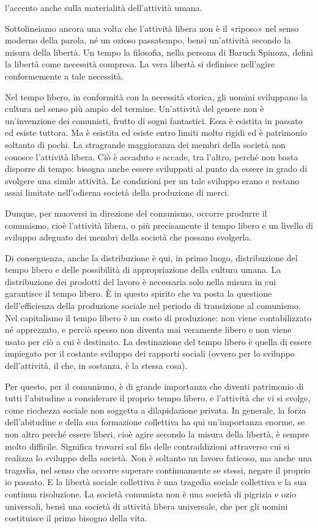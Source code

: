 \documentclass[12pt,a4paper,openany]{book}
\begin{document}
l'accento anche sulla materialità dell'attività umana.

Sottolineiamo ancora una volta che l'attività libera non è il «riposo» nel senso moderno della parola, né un ozioso passatempo, bensì un'attività secondo la misura della libertà. Un tempo la filosofia, nella persona di Baruch Spinoza, definì la libertà come necessità compresa. La vera libertà si definisce nell'agire conformemente a tale necessità.

Nel tempo libero, in conformità con la necessità storica, gli uomini sviluppano la cultura nel senso più ampio del termine. Un'attività del genere non è un'invenzione dei comunisti, frutto di sogni fantastici. Essa è esistita in passato ed esiste tuttora. Ma è esistita ed esiste entro limiti molto rigidi ed è patrimonio soltanto di pochi. La stragrande maggioranza dei membri della società non conosce l'attività libera. Ciò è accaduto e accade, tra l'altro, perché non basta disporre di tempo: bisogna anche essere sviluppati al punto da essere in grado di svolgere una simile attività. Le condizioni per un tale sviluppo erano e restano assai limitate nell'odierna società della produzione di merci.

Dunque, per muoversi in direzione del comunismo, occorre produrre il comunismo, cioè l'attività libera, o più precisamente il tempo libero e un livello di sviluppo adeguato dei membri della società che possano svolgerla.

Di conseguenza, anche la distribuzione è qui, in primo luogo, distribuzione del tempo libero e delle possibilità di appropriazione della cultura umana. La distribuzione dei prodotti del lavoro è necessaria solo nella misura in cui garantisce il tempo libero. È in questo spirito che va posta la questione dell'efficienza della produzione sociale nel periodo di transizione al comunismo. Nel capitalismo il tempo libero è un costo di produzione: non viene contabilizzato né apprezzato, e perciò spesso non diventa mai veramente libero e non viene usato per ciò a cui è destinato. La destinazione del tempo libero è quella di essere impiegato per il costante sviluppo dei rapporti sociali (ovvero per lo sviluppo dell'attività, il che, in sostanza, è la stessa cosa).

Per questo, per il comunismo, è di grande importanza che diventi patrimonio di tutti l'abitudine a considerare il proprio tempo libero, e l'attività che vi si svolge, come ricchezza sociale non soggetta a dilapidazione privata. In generale, la forza dell'abitudine e della sua formazione collettiva ha qui un'importanza enorme, se non altro perché essere liberi, cioè agire secondo la misura della libertà, è sempre molto difficile. Significa trovarsi sul filo delle contraddizioni attraverso cui si realizza lo sviluppo della società. Non è soltanto un lavoro faticoso, ma anche una tragedia, nel senso che occorre superare continuamente se stessi, negare il proprio io passato. E la libertà sociale collettiva è una tragedia sociale collettiva e la sua continua risoluzione. La società comunista non è una società di pigrizia e ozio universali, bensì una società di attività libera universale, che per gli uomini costituisce il primo bisogno della vita.
\end{document}
